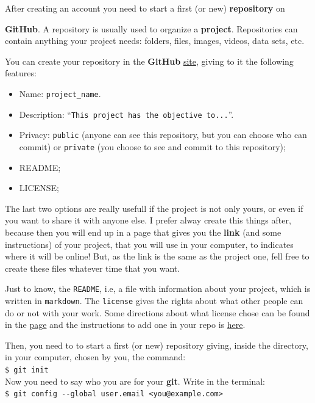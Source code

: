 \documentclass[12pt,a4paper,titlepage,brazil]{article}
\begin{document}
After creating an account you need to start a first (or new) {\bf repository} on {{\bf GitHub}. A repository is usually used to organize a {\bf project}. Repositories can contain anything your project needs: folders, files, images, videos, data sets, etc.

You can create your repository in the {\bf GitHub} \href{https://github.com}{site}, giving to it the following features:
\begin{itemize}
 \item Name: \texttt{project\_name}.
 \item Description: ``\texttt{This project has the objective to...}''.
 \item Privacy: \texttt{public} (anyone can see this repository, but you can choose who can commit) or \texttt{private} (you choose to see and commit to this repository);
 \item README;
 \item LICENSE;
\end{itemize}
The last two options are really usefull if the project is not only yours, or even if you want to share it with anyone else. I prefer alway create this things after, because then you will end up in a page that gives you the {\bf link} (and some instructions) of your project, that you will use in your computer, to indicates where it will be online! But, as the link is the same as the project one, fell free to create these files whatever time that you want.

Just to know, the \texttt{README}, i.e, a file with information about your project, which is written in \texttt{markdown}. The \texttt{license} gives the rights about what other people can do or not with your work. Some directions about what license chose can be found in the \href{https://opensource.guide/legal/#which-open-source-license-is-appropriate-for-my-project}{page} and the instructions to add one in your repo is \href{https://docs.github.com/en/github/creating-cloning-and-archiving-repositories/licensing-a-repository}{here}.

Then, you need to to start a first (or new) repository giving, inside the directory, in your computer, chosen by you, the command:\\

\texttt{\$ git init}\\

Now you need to say who you are for your {\bf git}. Write in the terminal:\\

\texttt{\$ git config -\hspace{0.01cm}-global user.email <you@example.com>}

}
\end{document}
